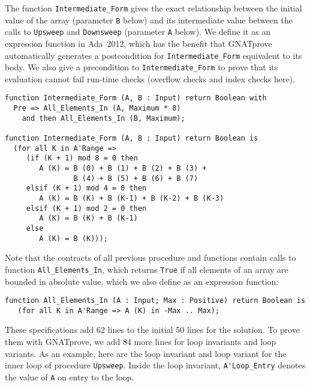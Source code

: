 \documentclass[sttt,draft]{svjour}
\newcommand{\gnatprove}{GNATprove\xspace}
\newcommand{\adatwtw}{Ada~2012\xspace}
\begin{document}
The function \verb|Intermediate_Form| gives the exact relationship between the
initial value of the array (parameter \verb|B| below) and its intermediate
value between the calls to \verb|Upsweep| and \verb|Downsweep| (parameter
\verb|A| below). We define it as an expression function in \adatwtw, which has
the benefit that \gnatprove automatically generates a postcondition for
\verb|Intermediate_Form| equivalent to its body. We also give a precondition to
\verb|Intermediate_Form| to prove that its evaluation cannot fail run-time
checks (overflow checks and index checks here).

\begin{footnotesize}
\begin{verbatim}
function Intermediate_Form (A, B : Input) return Boolean with
  Pre => All_Elements_In (A, Maximum * 8)
    and then All_Elements_In (B, Maximum);

function Intermediate_Form (A, B : Input) return Boolean is
  (for all K in A'Range =>
     (if (K + 1) mod 8 = 0 then
        A (K) = B (0) + B (1) + B (2) + B (3) +
                B (4) + B (5) + B (6) + B (7)
     elsif (K + 1) mod 4 = 0 then
        A (K) = B (K) + B (K-1) + B (K-2) + B (K-3)
     elsif (K + 1) mod 2 = 0 then
        A (K) = B (K) + B (K-1)
     else
        A (K) = B (K)));
\end{verbatim}
\end{footnotesize}

Note that the contracts of all previous procedure and functions contain calls
to function \verb|All_Elements_In|, which returns \verb|True| if all elements
of an array are bounded in absolute value, which we also define as an
expression function:

\begin{footnotesize}
\begin{verbatim}
function All_Elements_In (A : Input; Max : Positive) return Boolean is
   (for all K in A'Range => A (K) in -Max .. Max);
\end{verbatim}
\end{footnotesize}

These specifications add 62 lines to the initial 50 lines for the solution. To
prove them with \gnatprove, we add 84 more lines for loop invariants and loop
variants. As an example, here are the loop invariant and loop variant for the
inner loop of procedure \verb|Upsweep|. Inside the loop invariant,
\verb|A'Loop_Entry| denotes the value of \verb|A| on entry to the loop.
\end{document}
